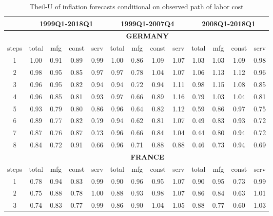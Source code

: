 \documentclass[11pt]{article}
\begin{document}
\begin{appendices}
\begin{table}[htbp]
\small
  \centering
  \caption{Theil-U of inflation forecasts conditional on observed path of labor cost}
    \begin{tabular}{c|cccc|cccc|cccc}
    \toprule
    \multicolumn{1}{r}{} & \multicolumn{4}{c}{\textbf{1999Q1-2018Q1}} & \multicolumn{4}{c}{\textbf{1999Q1-2007Q4}} & \multicolumn{4}{c}{\textbf{2008Q1-2018Q1}} \\
    \midrule
    \multicolumn{1}{c}{} & \multicolumn{12}{c}{\textbf{GERMANY}} \\
    \midrule
    steps & total & mfg   & const & serv  & total & mfg   & const & serv  & total & mfg   & const & serv \\
    \midrule
    1     & 1.00  & 0.91  & 0.89  & 0.99  & 1.00  & 0.86  & 1.09  & 1.07  & 1.03  & 1.03  & 1.09  & 0.98 \\
    2     & 0.98  & 0.95  & 0.85  & 0.97  & 0.97  & 0.78  & 1.04  & 1.07  & 1.06  & 1.13  & 1.12  & 0.96 \\
    3     & 0.96  & 0.95  & 0.82  & 0.94  & 0.94  & 0.72  & 0.94  & 1.11  & 0.98  & 1.15  & 1.08  & 0.85 \\
    4     & 0.96  & 0.85  & 0.81  & 0.93  & 0.97  & 0.66  & 0.89  & 1.16  & 0.79  & 1.03  & 1.04  & 0.81 \\
    5     & 0.93  & 0.79  & 0.80  & 0.86  & 0.96  & 0.64  & 0.82  & 1.12  & 0.59  & 0.86  & 0.97  & 0.75 \\
    6     & 0.89  & 0.77  & 0.82  & 0.79  & 0.94  & 0.62  & 0.81  & 1.07  & 0.49  & 0.83  & 0.93  & 0.72 \\
    7     & 0.87  & 0.76  & 0.87  & 0.73  & 0.96  & 0.66  & 0.84  & 1.04  & 0.44  & 0.80  & 0.94  & 0.72 \\
    8     & 0.84  & 0.72  & 0.91  & 0.66  & 0.96  & 0.71  & 0.88  & 0.88  & 0.46  & 0.73  & 0.94  & 0.69 \\
    \midrule
    \multicolumn{1}{c}{} & \multicolumn{12}{c}{\textbf{FRANCE}} \\
    \midrule
    steps & total & mfg   & const & serv  & total & mfg   & const & serv  & total & mfg   & const & serv \\
    \midrule
    1     & 0.78  & 0.94  & 0.83  & 0.99  & 0.90  & 0.96  & 0.95  & 1.07  & 0.90  & 0.95  & 0.73  & 0.99 \\
    2     & 0.75  & 0.88  & 0.78  & 1.00  & 0.88  & 0.93  & 0.98  & 1.07  & 0.86  & 0.84  & 0.63  & 1.01 \\
    3     & 0.74  & 0.83  & 0.77  & 0.99  & 0.86  & 0.90  & 1.04  & 1.05  & 0.88  & 0.77  & 0.60  & 1.03 \\

\end{tabular}
\end{table}
\end{appendices}
\end{document}
